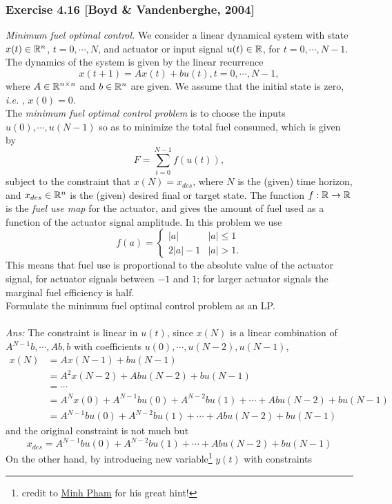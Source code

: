 \documentclass[12pt,a4paper]{article}
\newcommand{\ra}[1]{\ifnum #1=1\rightarrow\fi\ifnum #1=2\Rightarrow\fi\ifnum #1=3\Rrightarrow\fi\ifnum #1=4\rightrightarrows\fi\ifnum #1=5\rightleftarrows\fi\ifnum #1=6\mapsto\fi\ifnum #1=7\fi\ifnum #1=8\twoheadrightarrow\fi\ifnum #1=9\rightharpoonup\fi\ifnum #1=0\rightharpoondown\fi}
\renewcommand{\l}{\left}\renewcommand{\r}{\right}
\newcommand{\SUM}[2]{\sum\limits_{#1}^{#2}}
\newcommand{\x}{\times}
\newcommand\ie{{\it i.e. }}
\def\R{\ifmmode\mathbb R\fi}
\begin{document}
\subsubsection*{Exercise 4.16 [Boyd \& Vandenberghe, 2004]}
{\it Minimum fuel optimal control.} We consider a linear dynamical system with state $x(t) \in \R^n$, $t = 0, \cdots, N$, and actuator or input signal $u(t) \in \R$, for $t=0, \cdots, N-1$. The dynamics of the system is given by the linear recurrence 
$$x(t+1) = Ax(t) + bu(t), t = 0, \cdots, N-1,$$
where $A \in \R^{n\x n}$ and $b\in \R^n$ are given. We assume that the initial state is zero, \ie, $x(0) = 0$. \\
The {\it minimum fuel optimal control problem} is to choose the inputs $u(0), \cdots, u(N-1)$ so as to minimize the total fuel consumed, which is given by
$$F = \SUM{i=0}{N-1} f(u(t)),$$
subject to the constraint that $x(N) = x_{des}$, where $N$ is the (given) time horizon, and $x_{des} \in \R^n$ is the (given) desired final or target state. The function $f:\R\ra1\R$ is the {\it fuel use map} for the actuator, and gives the amount of fuel used as a function of the actuator signal amplitude. In this problem we use 
$$f(a) = \l\{\begin{array}{cc}
|a| & |a|\leq 1\\
2|a|-1 & |a| > 1.\end{array}\r.$$
This means that fuel use is proportional to the absolute value of the actuator signal, for actuator signals between $-1$ and $1$; for larger actuator signals the marginal fuel efficiency is half. \\
Formulate the minimum fuel optimal control problem as an LP. \\
\\
{\it Ans:} 
The constraint is linear in $u(t)$, since $x(N)$ is a linear combination of $A^{N-1}b, \cdots, Ab, b$ with coefficients $u(0), \cdots, u(N-2), u(N-1)$,
\begin{align*} x(N) &= Ax(N-1) + bu(N-1)\\
&= A^2 x(N-2) + Abu(N-2) + bu(N-1)\\
&= \cdots \\
&= A^N x(0) + A^{N-1}bu(0) + A^{N-2}bu(1) + \cdots + Abu(N-2) + bu(N-1) \\
&=A^{N-1}bu(0) + A^{N-2}bu(1) + \cdots + Abu(N-2) + bu(N-1) 
\end{align*}
and the original constraint is not much but
$$x_{des} = A^{N-1}bu(0) + A^{N-2}bu(1) + \cdots + Abu(N-2) + bu(N-1) $$
On the other hand, by introducing new variable\footnote{credit to \href{http://www.math.ucla.edu/~minhrose/}{Minh Pham} for his great hint!} $y(t)$ with constraints
\end{document}
